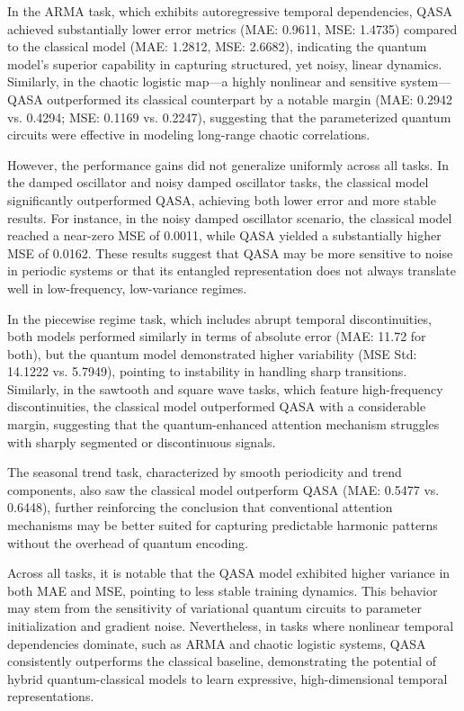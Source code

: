 \documentclass[conference]{IEEEtran}
\begin{document}
In the ARMA task, which exhibits autoregressive temporal dependencies, QASA achieved substantially lower error metrics (MAE: 0.9611, MSE: 1.4735) compared to the classical model (MAE: 1.2812, MSE: 2.6682), indicating the quantum model’s superior capability in capturing structured, yet noisy, linear dynamics. Similarly, in the chaotic logistic map—a highly nonlinear and sensitive system—QASA outperformed its classical counterpart by a notable margin (MAE: 0.2942 vs. 0.4294; MSE: 0.1169 vs. 0.2247), suggesting that the parameterized quantum circuits were effective in modeling long-range chaotic correlations.

However, the performance gains did not generalize uniformly across all tasks. In the damped oscillator and noisy damped oscillator tasks, the classical model significantly outperformed QASA, achieving both lower error and more stable results. For instance, in the noisy damped oscillator scenario, the classical model reached a near-zero MSE of 0.0011, while QASA yielded a substantially higher MSE of 0.0162. These results suggest that QASA may be more sensitive to noise in periodic systems or that its entangled representation does not always translate well in low-frequency, low-variance regimes.

In the piecewise regime task, which includes abrupt temporal discontinuities, both models performed similarly in terms of absolute error (MAE: 11.72 for both), but the quantum model demonstrated higher variability (MSE Std: 14.1222 vs. 5.7949), pointing to instability in handling sharp transitions. Similarly, in the sawtooth and square wave tasks, which feature high-frequency discontinuities, the classical model outperformed QASA with a considerable margin, suggesting that the quantum-enhanced attention mechanism struggles with sharply segmented or discontinuous signals.

The seasonal trend task, characterized by smooth periodicity and trend components, also saw the classical model outperform QASA (MAE: 0.5477 vs. 0.6448), further reinforcing the conclusion that conventional attention mechanisms may be better suited for capturing predictable harmonic patterns without the overhead of quantum encoding.

Across all tasks, it is notable that the QASA model exhibited higher variance in both MAE and MSE, pointing to less stable training dynamics. This behavior may stem from the sensitivity of variational quantum circuits to parameter initialization and gradient noise. Nevertheless, in tasks where nonlinear temporal dependencies dominate, such as ARMA and chaotic logistic systems, QASA consistently outperforms the classical baseline, demonstrating the potential of hybrid quantum-classical models to learn expressive, high-dimensional temporal representations.
\end{document}

